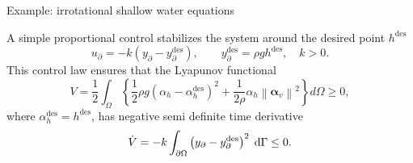 \documentclass[aspectratio=169]{ISAE-Beamer}
\newcommand*{\norm}[1]{\ensuremath{\left\|#1\right\|}}
\begin{document}
\begin{frame}{Example: irrotational shallow water equations}

A simple proportional control stabilizes the system around the desired point $h^{\text{des}}$
	\begin{equation*}
	u_\partial = -k (y_\partial - y_\partial^{\text{des}}), \qquad y_\partial^{\text{des}}= \rho g h^{\text{des}}, \quad k>0.
	\end{equation*}
	This control law ensures that the Lyapunov functional
	\begin{equation*}
	V = \frac{1}{2} \int_{\Omega}\left\{\frac{1}{2} \rho g (\alpha_h - \alpha_h^{\text{des}})^2 + \frac{1}{2\rho} \alpha_h \norm{\bm{\alpha}_v}^2 \right\} d\Omega \ge 0,
	\end{equation*}
	where $\alpha_h^{\text{des}}=h^{\text{des}}$, has negative semi definite time derivative
	\begin{equation*}
	\dot{V} = -k \int_{\partial \Omega}\left({y}_\partial - {y}_\partial^{\text{des}} \right)^2 \d{\Gamma} \le 0.
	\end{equation*}
\end{frame}
\end{document}
